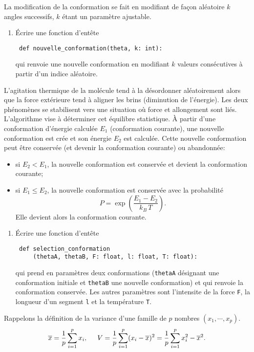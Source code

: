 La modification de la conformation se fait en modifiant de façon aléatoire $k$ angles successifs, $k$ étant un paramètre ajustable.
\begin{enumerate}[resume]
 \item \'Ecrire une fonction d'entête
\begin{verbatim}
 def nouvelle_conformation(theta, k: int):
\end{verbatim}
qui renvoie une nouvelle conformation en modifiant $k$ valeurs consécutives à partir d'un indice aléatoire.
\end{enumerate}
L'agitation thermique de la molécule tend à la désordonner aléatoirement alors que la force extérieure tend à aligner les brins (diminution de l'énergie). Les deux phénomènes se stabilisent vers une situation où force et allongement sont liés. L'algorithme vise à déterminer cet équilibre statistique.\newline
\`A partir d'une conformation d'énergie calculée $E_1$ (conformation courante), une nouvelle conformation est crée et son énergie $E_2$ est calculée. Cette nouvelle conformation peut être conservée (et devenir la conformation courante) ou abandonnée:
\begin{itemize}
 \item si $E_2 < E_1$, la nouvelle conformation est conservée et devient la conformation courante;
 \item si $E_1 \leq E_2$, la nouvelle conformation est conservée avec la probabilité 
\[
 P = \exp \left( \frac{E_1 - E_2}{k_B\,T}\right) .
\]
 Elle devient alors la conformation courante.
\end{itemize}
\begin{enumerate}[resume]
 \item \'Ecrire une fonction d'entête
\begin{verbatim}
 def selection_conformation
     (thetaA, thetaB, F: float, l: float, T: float):
\end{verbatim}
qui prend en paramètres deux conformations (\texttt{thetaA} désignant une conformation initiale et \texttt{thetaB} une nouvelle conformation) et qui renvoie la conformation conservée. Les autres paramètres sont l'intensite de la force \texttt{F}, la longueur d'un segment \texttt{l} et la température \texttt{T}.
\end{enumerate}
Rappelons la définition de la variance d'une famille de $p$ nombres $(x_1, \cdots, x_p)$.
\[
 \overline{x} = \frac{1}{p}\sum_{i=1}^{p}x_i, \hspace{0.5cm} V = \frac{1}{p}\sum_{i=1}^{p}(x_i - \overline{x})^2 = \frac{1}{p}\sum_{i=1}^{p}x_i^2 - \overline{x}^2.
\] 
